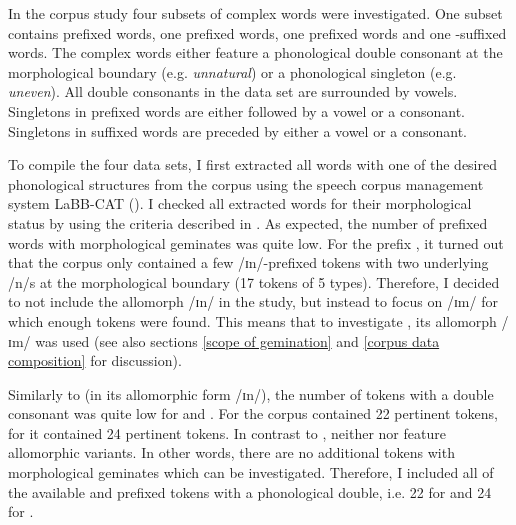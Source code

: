 In the corpus study four subsets of complex words were investigated. One subset contains prefixed words, one prefixed words,
 one prefixed words and one -suffixed words. The complex words either feature a phonological double consonant at the morphological boundary (e.g. \textit{unnatural}) or a phonological singleton (e.g. \textit{uneven}).
All double consonants in the data set are surrounded by vowels. Singletons in prefixed words are either followed by a vowel or a consonant. Singletons in suffixed words are preceded by either a vowel or a consonant.

To compile the four data sets, I first extracted all words with one of the desired phonological structures from the corpus using the speech corpus management system LaBB-CAT (\citealt{Fromont.2012,Fromont.20032015}).  
I checked all extracted words for their morphological status by using the criteria described in .
As expected, the number of prefixed words with morphological geminates was quite low. 
For the prefix ,
it turned out that the corpus only contained a few /ɪn/-prefixed tokens with two underlying /n/s at the morphological boundary (17 tokens of 5 types). Therefore, I decided to not include the allomorph /ɪn/ in the study, but instead to focus on /ɪm/ for which enough tokens were found. This means that to investigate , its allomorph /ɪm/ was used (see also sections \ref{scope of gemination} and \ref{corpus data composition} for discussion).

Similarly to  (in its allomorphic form /ɪn/), the number of tokens with a double consonant was quite low for  and . For  the corpus contained 22 pertinent tokens, for  it contained 24 pertinent tokens. In contrast to , neither  nor  feature allomorphic variants. In other words, there are no additional tokens with morphological geminates which can be investigated. Therefore, I included all of the available  and prefixed tokens with a phonological double, i.e. 22 for  and 24 for . 

